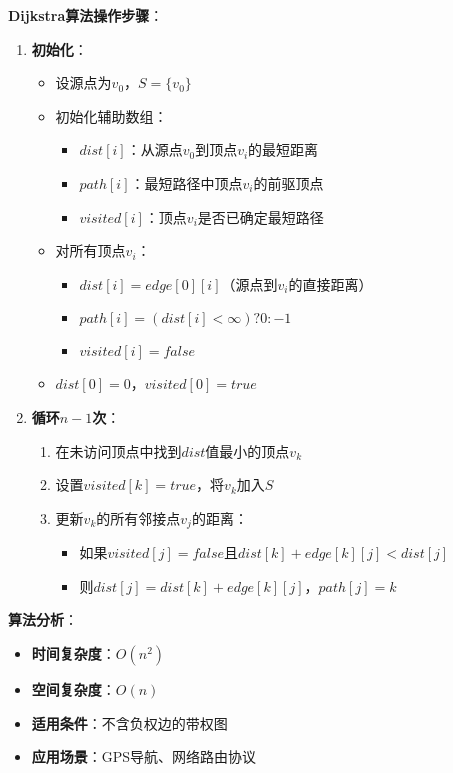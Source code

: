 \documentclass[12pt,a4paper]{amsart}
\begin{document}
\textbf{Dijkstra算法操作步骤}：
\begin{enumerate}
    \item \textbf{初始化}：
    \begin{itemize}
        \item 设源点为$v_0$，$S = \{v_0\}$
        \item 初始化辅助数组：
        \begin{itemize}
            \item $dist[i]$：从源点$v_0$到顶点$v_i$的最短距离
            \item $path[i]$：最短路径中顶点$v_i$的前驱顶点
            \item $visited[i]$：顶点$v_i$是否已确定最短路径
        \end{itemize}
        \item 对所有顶点$v_i$：
        \begin{itemize}
            \item $dist[i] = edge[0][i]$（源点到$v_i$的直接距离）
            \item $path[i] = (dist[i] < \infty) ? 0 : -1$
            \item $visited[i] = false$
        \end{itemize}
        \item $dist[0] = 0$，$visited[0] = true$
    \end{itemize}
    \item \textbf{循环$n-1$次}：
    \begin{enumerate}
        \item 在未访问顶点中找到$dist$值最小的顶点$v_k$
        \item 设置$visited[k] = true$，将$v_k$加入$S$
        \item 更新$v_k$的所有邻接点$v_j$的距离：
        \begin{itemize}
            \item 如果$visited[j] = false$且$dist[k] + edge[k][j] < dist[j]$
            \item 则$dist[j] = dist[k] + edge[k][j]$，$path[j] = k$
        \end{itemize}
    \end{enumerate}
\end{enumerate}

\textbf{算法分析}：
\begin{itemize}
    \item \textbf{时间复杂度}：$O(n^2)$
    \item \textbf{空间复杂度}：$O(n)$
    \item \textbf{适用条件}：不含负权边的带权图
    \item \textbf{应用场景}：GPS导航、网络路由协议
\end{itemize}
\end{document}
